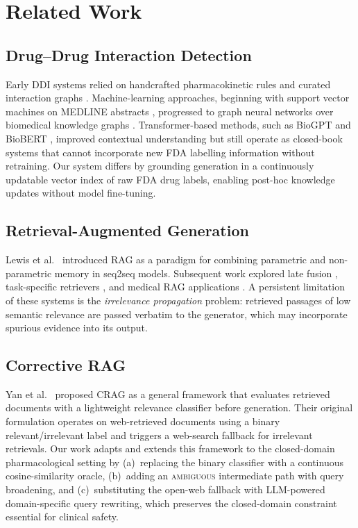 \documentclass[10pt, twocolumn]{article}
\begin{document}
\section{Related Work}
\label{sec:related}

\subsection{Drug--Drug Interaction Detection}

Early DDI systems relied on handcrafted pharmacokinetic rules and
curated interaction graphs \cite{wishart2018drugbank}.  Machine-learning
approaches, beginning with support vector machines on MEDLINE abstracts
\cite{segura2013semeval}, progressed to graph neural networks over
biomedical knowledge graphs \cite{lin2020kgnn}.  Transformer-based
methods, such as BioGPT \cite{luo2022biogpt} and BioBERT
\cite{lee2020biobert}, improved contextual understanding but still
operate as closed-book systems that cannot incorporate new FDA labelling
information without retraining.  Our system differs by grounding
generation in a continuously updatable vector index of raw FDA drug
labels, enabling post-hoc knowledge updates without model fine-tuning.

\subsection{Retrieval-Augmented Generation}

Lewis et al.\ \cite{lewis2020rag} introduced RAG as a paradigm for
combining parametric and non-parametric memory in seq2seq models.
Subsequent work explored late fusion \cite{izacard2021fid},
task-specific retrievers \cite{karpukhin2020dpr}, and medical RAG
applications \cite{xiong2024benchmarking}.  A persistent limitation of
these systems is the \emph{irrelevance propagation} problem: retrieved
passages of low semantic relevance are passed verbatim to the generator,
which may incorporate spurious evidence into its output.

\subsection{Corrective RAG}

Yan et al.\ \cite{yan2024crag} proposed CRAG as a general framework
that evaluates retrieved documents with a lightweight relevance
classifier before generation.  Their original formulation operates on
web-retrieved documents using a binary relevant/irrelevant label and
triggers a web-search fallback for irrelevant retrievals.  Our work
adapts and extends this framework to the closed-domain pharmacological
setting by (a)~replacing the binary classifier with a continuous
cosine-similarity oracle, (b)~adding an \textsc{ambiguous} intermediate
path with query broadening, and (c)~substituting the open-web fallback
with LLM-powered domain-specific query rewriting, which preserves the
closed-domain constraint essential for clinical safety.
\end{document}
